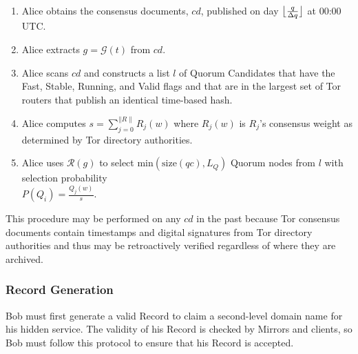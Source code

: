 \documentclass[conference]{IEEEtran}
\DeclarePairedDelimiter{\floor}{\lfloor}{\rfloor}
\newcommand*\concat{\mathbin{\|}}
\begin{document}
\begin{enumerate}
	\item Alice obtains the consensus documents, $ \mathit{cd} $, published on day $ \floor[\big]{\frac{q}{\Delta q}} $ at 00:00 UTC.
	\item Alice extracts $ g = \mathcal{G}(t) $ from $ cd $.
	\item Alice scans $ \mathit{cd} $ and constructs a list $ l $ of Quorum Candidates that have the Fast, Stable, Running, and Valid flags and that are in the largest set of Tor routers that publish an identical time-based hash.
	\item Alice computes $ s = \sum_{j=0}^{\concat R \concat} R_{j}(w) $ where $ R_{j}(w) $ is $ R_{j} $'s consensus weight as determined by Tor directory authorities.
	\item Alice uses $ \mathcal{R}(g) $ to select $ \mathrm{min}(\mathrm{size}(\mathit{qc}), L_{Q}) $ Quorum nodes from $ l $ with selection probability \\ $ P (Q_{i}) = \frac{Q_{j}(w)}{s} $.
\end{enumerate}

This procedure may be performed on any $ \mathit{cd} $ in the past because Tor consensus documents contain timestamps and digital signatures from Tor directory authorities and thus may be retroactively verified regardless of where they are archived.

\subsubsection{Record Generation}
\label{sec:RecordGeneration}

Bob must first generate a valid Record to claim a second-level domain name for his hidden service. The validity of his Record is checked by Mirrors and clients, so Bob must follow this protocol to ensure that his Record is accepted.
\end{document}
